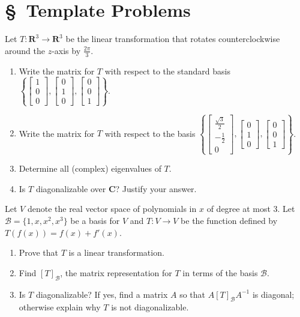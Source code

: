 \documentclass[11pt,twoside,openany]{memoir}
\begin{document}
\section*{\S\ Template Problems}
\begin{exercise}
    Let $T:\mathbf{R}^3\to \mathbf{R}^3$ be the linear transformation that rotates counterclockwise around the $z$-axis by $\frac{2\pi}{3}$.
    \begin{enumerate}[label=(\alph*)]
        \item Write the matrix for $T$ with respect to the standard basis $\left\{\begin{bmatrix} 1 \\ 0 \\ 0 \end{bmatrix},\begin{bmatrix} 0 \\ 1 \\ 0\end{bmatrix},\begin{bmatrix} 0 \\ 0 \\ 1\end{bmatrix}\right\}$.
        \item Write the matrix for $T$ with respect to the basis $\left\{\begin{bmatrix} \frac{\sqrt{3}}{2} \\ -\frac{1}{2} \\ 0 \end{bmatrix},\begin{bmatrix} 0 \\ 1 \\ 0\end{bmatrix},\begin{bmatrix} 0 \\ 0 \\ 1\end{bmatrix}\right\}$.
        \item Determine all (complex) eigenvalues of $T$.
        \item Is $T$ diagonalizable over $\mathbf{C}$? Justify your answer.
    \end{enumerate}
    \end{exercise}
    
    \begin{exercise}
    Let $V$ denote the real vector space of polynomials in $x$ of degree at most 3. Let $\mathcal{B}=\{1, x, x^2, x^3\}$ be a basis for $V$ and $T:V\to V$ be the function defined by $T(f(x))=f(x)+f'(x)$.
    \begin{enumerate}[label=(\alph*)]
        \item Prove that $T$ is a linear transformation.
        \item Find $[T]_{\mathcal{B}}$, the matrix representation for $T$ in terms of the basis $\mathcal{B}$.
        \item Is $T$ diagonalizable? If yes, find a matrix $A$ so that $A[T]_{\mathcal{B}}A^{-1}$ is diagonal; otherwise explain why $T$ is not diagonalizable.
    \end{enumerate}
    \end{exercise}
    
\end{document}
